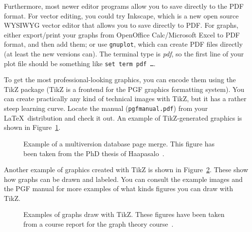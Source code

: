 

Furthermore, most newer editor programs allow you to save directly to the PDF
format. For vector editing, you could try Inkscape, which is a new open source
WYSIWYG vector editor that allows you to save directly to PDF\@.
For graphs, either export/print your graphs from OpenOffice Calc/Microsoft
Excel to PDF format, and then add them; or use \texttt{gnuplot}, which can
create PDF files directly (at least the new versions can).
The terminal type is \emph{pdf}, so the first line of your plot file should be
something like \texttt{set term pdf \ldots}.

To get the most professional-looking graphics, you can encode them using the
TikZ package (TikZ is a frontend for the PGF graphics formatting system).
You can create practically any kind of technical images with TikZ, but it has a
rather steep learning curve. Locate the manual (\texttt{pgfmanual.pdf}) from
your \LaTeX\ distribution and check it out. An example of TikZ-generated
graphics is shown in Figure~\ref{fig:page-merge}.

\begin{figure}[ht]
  \begin{center}
    
    \caption{Example of a multiversion database page merge. This figure has
    been taken from the PhD thesis of Haapasalo~\cite{HaapasaloThesis}.}
    \label{fig:page-merge}
  \end{center}
\end{figure}

Another example of graphics created with TikZ is shown in
Figure~\ref{fig:tikz-examples}.
These show how graphs can be drawn and labeled.
You can consult the example images and the PGF manual for more examples of what
kinds figures you can draw with TikZ.

\newlength{\graphdotsize}
\setlength{\graphdotsize}{1.7pt}
\newlength{\graphgridsize}
\setlength{\graphgridsize}{1.2em}
\begin{figure}[ht]
\begin{center}
\caption{Examples of graphs draw with TikZ. These figures have been taken from a
course report for the graph theory course~\cite{FerryProblem}.}
\label{fig:tikz-examples}
\end{center}
\end{figure}
